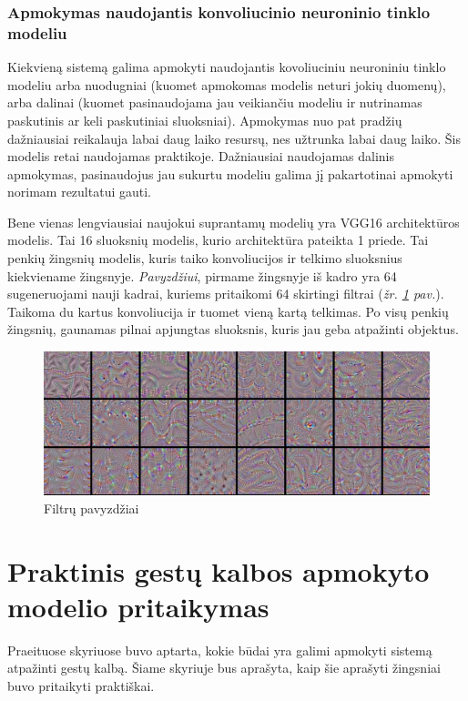\documentclass{VUMIFInfKursinis}
\begin{document}
\subsubsection{Apmokymas naudojantis konvoliucinio neuroninio tinklo modeliu}

Kiekvieną sistemą galima apmokyti naudojantis kovoliuciniu neuroniniu tinklo modeliu arba nuodugniai (kuomet apmokomas modelis neturi jokių duomenų), arba dalinai (kuomet pasinaudojama jau veikiančiu modeliu ir nutrinamas paskutinis ar keli paskutiniai sluoksniai). Apmokymas nuo pat pradžių dažniausiai reikalauja labai daug laiko resursų, nes užtrunka labai daug laiko. Šis modelis retai naudojamas praktikoje. Dažniausiai naudojamas dalinis apmokymas, pasinaudojus jau sukurtu modeliu galima jį pakartotinai apmokyti norimam rezultatui gauti. 

Bene vienas lengviausiai naujokui suprantamų modelių yra VGG16 architektūros modelis. Tai 16 sluoksnių modelis, kurio architektūra pateikta 1 priede. Tai penkių žingsnių modelis, kuris taiko konvoliucijos ir telkimo sluoksnius kiekviename žingsnyje. \textit{Pavyzdžiui}, pirmame žingsnyje iš kadro yra 64 sugeneruojami nauji kadrai, kuriems pritaikomi 64 skirtingi filtrai (\textit{žr. \ref{img:filtersvgg} pav.}). Taikoma du kartus konvoliucija ir tuomet vieną kartą telkimas. Po visų penkių žingsnių, gaunamas pilnai apjungtas sluoksnis, kuris jau geba atpažinti objektus. 

\begin{figure}[H]
	\centering
	\includegraphics[width=.6\linewidth]{img/vgg16filters}
	\caption[]{Filtrų pavyzdžiai\footnotemark}
	\label{img:filtersvgg}
\end{figure}

\section{Praktinis gestų kalbos apmokyto modelio pritaikymas}

Praeituose skyriuose buvo aptarta, kokie būdai yra galimi apmokyti sistemą atpažinti gestų kalbą. Šiame skyriuje bus aprašyta, kaip šie aprašyti žingsniai buvo pritaikyti praktiškai.
\end{document}
